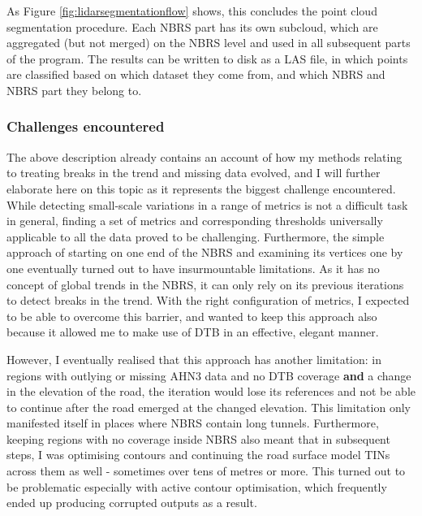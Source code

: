 As Figure \ref{fig:lidarsegmentationflow} shows, this concludes the point cloud segmentation procedure. Each NBRS part has its own subcloud, which are aggregated (but not merged) on the NBRS level and used in all subsequent parts of the program. The results can be written to disk as a LAS file, in which points are classified based on which dataset they come from, and which NBRS and NBRS part they belong to.

\subsubsection{Challenges encountered}

The above description already contains an account of how my methods relating to treating breaks in the trend and missing data evolved, and I will further elaborate here on this topic as it represents the biggest challenge encountered. While detecting small-scale variations in a range of metrics is not a difficult task in general, finding a set of metrics and corresponding thresholds universally applicable to all the data proved to be challenging. Furthermore, the simple approach of starting on one end of the NBRS and examining its vertices one by one eventually turned out to have insurmountable limitations. As it has no concept of global trends in the NBRS, it can only rely on its previous iterations to detect breaks in the trend. With the right configuration of metrics, I expected to be able to overcome this barrier, and wanted to keep this approach also because it allowed me to make use of DTB in an effective, elegant manner.

However, I eventually realised that this approach has another limitation: in regions with outlying or missing AHN3 data and no DTB coverage \textbf{and} a change in the elevation of the road, the iteration would lose its references and not be able to continue after the road emerged at the changed elevation. This limitation only manifested itself in places where NBRS contain long tunnels. Furthermore, keeping regions with no coverage inside NBRS also meant that in subsequent steps, I was optimising contours and continuing the road surface model TINs across them as well - sometimes over tens of metres or more. This turned out to be problematic especially with active contour optimisation, which frequently ended up producing corrupted outputs as a result.

